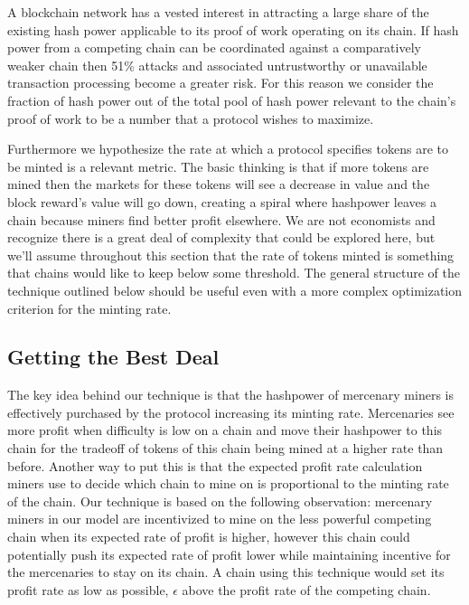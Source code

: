 \documentclass[10pt, preprint]{aastex}
\begin{document}
A blockchain network has a vested interest in attracting a large share of the existing hash power applicable to its proof of work operating on its chain.  If hash power from a competing chain can be coordinated against a comparatively weaker chain then 51\% attacks and associated untrustworthy or unavailable transaction processing become a greater risk.  For this reason we consider the fraction of hash power out of the total pool of hash power relevant to the chain's proof of work to be a number that a protocol wishes to maximize.

Furthermore we hypothesize the rate at which a protocol specifies tokens are to be minted is a relevant metric.  The basic thinking is that if more tokens are mined then the markets for these tokens will see a decrease in value and the block reward's value will go down, creating a spiral where hashpower leaves a chain because miners find better profit elsewhere. We are not economists and recognize there is a great deal of complexity that could be explored here, but we'll assume throughout this section that the rate of tokens minted is something that chains would like to keep below some threshold.  The general structure of the technique outlined below should be useful even with a more complex optimization criterion for the minting rate.

\subsection{Getting the Best Deal}
The key idea behind our technique is that the hashpower of mercenary miners is effectively purchased by the protocol increasing its minting rate.  Mercenaries see more profit when difficulty is low on a chain and move their hashpower to this chain for the tradeoff of tokens of this chain being mined at a higher rate than before.  Another way to put this is that the expected profit rate calculation miners use to decide which chain to mine on is proportional to the minting rate of the chain.  Our technique is based on the following observation: mercenary miners in our model are incentivized to mine on the less powerful competing chain when its expected rate of profit is higher, however this chain could potentially push its expected rate of profit lower while maintaining incentive for the mercenaries to stay on its chain.  A chain using this technique would set its profit rate as low as possible, $\epsilon$ above the profit rate of the competing chain. 
\end{document}
